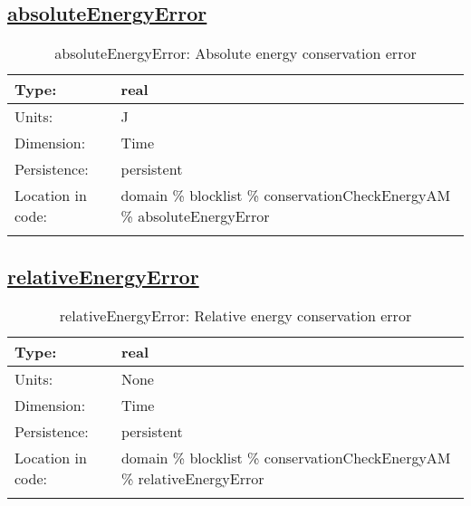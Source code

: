 \subsection[absoluteEnergyError]{\hyperref[sec:var_tab_conservationCheckEnergyAM]{absoluteEnergyError}}
\label{subsec:var_sec_conservationCheckEnergyAM_absoluteEnergyError}
\begin{center}
\begin{longtable}{| p{2.0in} | p{4.0in} |}
        \hline 
        Type: & real \\
        \hline 
        Units: & \si{J} \\
        \hline 
        Dimension: & Time \\
        \hline 
        Persistence: & persistent \\
        \hline 
         Location in code: & domain \% blocklist \% conservationCheckEnergyAM \% absoluteEnergyError \\
         \hline 
    \caption{absoluteEnergyError: Absolute energy conservation error}
\end{longtable}
\end{center}
\subsection[relativeEnergyError]{\hyperref[sec:var_tab_conservationCheckEnergyAM]{relativeEnergyError}}
\label{subsec:var_sec_conservationCheckEnergyAM_relativeEnergyError}
\begin{center}
\begin{longtable}{| p{2.0in} | p{4.0in} |}
        \hline 
        Type: & real \\
        \hline 
        Units: & \si{None} \\
        \hline 
        Dimension: & Time \\
        \hline 
        Persistence: & persistent \\
        \hline 
         Location in code: & domain \% blocklist \% conservationCheckEnergyAM \% relativeEnergyError \\
         \hline 
    \caption{relativeEnergyError: Relative energy conservation error}
\end{longtable}
\end{center}

